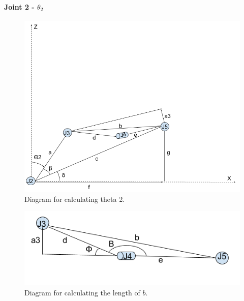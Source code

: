 \documentclass{article}
\begin{document}
\paragraph{Joint 2 - $\theta _2$}
\begin{figure}[H]
    \includegraphics[width=\linewidth]{theta2.png}
    \caption{Diagram for calculating theta 2.}
    \label{fig:theta3}
\end{figure}
\begin{figure}[H]
    \includegraphics[width=\linewidth]{offsetangle.png}
    \caption{Diagram for calculating the length of $b$.}
    \label{fig:offsetangle}
\end{figure}
\end{document}
